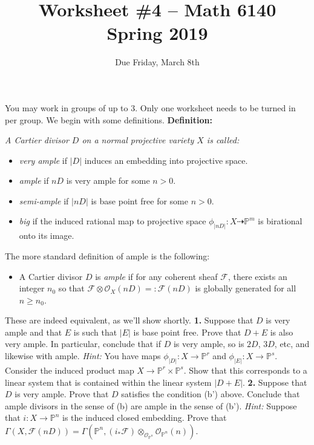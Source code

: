 \documentclass[11pt]{amsart}
\theoremstyle{theorem}
\renewcommand{\O}{\mathcal O}
\renewcommand{\to}[1][]{\xrightarrow{\ #1\ }}
\newcommand{\bP}{\mathbb{P}}
\newcommand{\cF}{\mathcal{F}}
\begin{document}
\title{Worksheet \#4 -- Math 6140\\Spring 2019}
\author{Due Friday, March 8th}

\maketitle
You may work in groups of up to 3.  Only one worksheet needs to be turned in per group.
\vskip 9pt
\noindent
We begin with some definitions.
\vskip 9pt
{\bf Definition:} {\it 
A Cartier divisor $D$ on a normal projective variety $X$ is called:
\begin{itemize} 
\item[(a)] \emph{very ample} if $|D|$ induces an embedding into projective space.
\item[(b)] \emph{ample} if $nD$ is very ample for some $n > 0$.
\item[(c)] \emph{semi-ample} if $|nD|$ is base point free for some $n > 0$.
\item[(d)] \emph{big} if the induced rational map to projective space $\phi_{|nD|} : X \dashrightarrow \bP^m$ is birational onto its image.
\end{itemize}
}
\vskip 9pt
The more standard definition of ample is the following:
{\it
\begin{itemize}
\item[(b')]  A Cartier divisor $D$ is \emph{ample} if for any coherent sheaf $\cF$, there exists an integer $n_0$ so that $\cF \otimes \O_X(nD) =: \cF(nD)$ is globally generated for all $n \geq n_0$.  
\end{itemize}
}
These are indeed equivalent, as we'll show shortly.  
\vskip 9pt
\noindent
{\bf 1.}  Suppose that $D$ is very ample and that $E$ is such that $|E|$ is base point free.  Prove that $D+E$ is also very ample.  In particular, conclude that if $D$ is very ample, so is $2D$, $3D$, etc, and likewise with ample.  
\vskip 3pt
\emph{Hint:} You have maps $\phi_{|D|} : X \to \bP^r$ and $\phi_{|E|} : X \to \bP^s$.  Consider the induced product map $X \to \bP^r \times \bP^s$.  Show that this corresponds to a linear system that is contained within the linear system $|D+E|$.
\newpage
\noindent
{\bf 2.}  Suppose that $D$ is very ample.  Prove that $D$ satisfies the condition (b') above.  Conclude that ample divisors in the sense of (b) are ample in the sense of (b').
\vskip 3pt
\emph{Hint:} Suppose that $i : X \to \bP^n$ is the induced closed embedding.  Prove that $\Gamma(X, \cF(nD)) = \Gamma(\bP^n, (i_* \cF) \otimes_{\O_{\bP^n}} \O_{\bP^n}(n))$.
\vskip 250pt
\noindent
\end{document}
